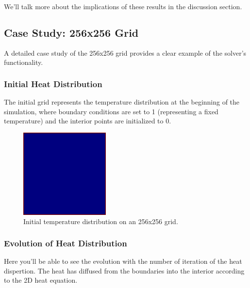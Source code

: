 \documentclass[11pt]{article}
\begin{document}
        We'll talk more about the implications of these results in the discussion section.

        \subsection{Case Study: 256x256 Grid}
        A detailed case study of the 256x256 grid provides a clear example of the solver's functionality.

        \subsubsection{Initial Heat Distribution}
    The initial grid represents the temperature distribution at the beginning of the simulation, where boundary conditions are set to 1 (representing a fixed temperature) and the interior points are initialized to 0.

    \begin{figure}[ht]
        \centering
        \includegraphics[width=0.4\textwidth]{img/initial_grid.png}
        \caption{Initial temperature distribution on an 256x256 grid.}
        \label{fig:initial_grid}
    \end{figure}

    \subsubsection{Evolution of Heat Distribution}
    Here you'll be able to see the evolution with the number of iteration of the heat dispertion. The heat has diffused from the boundaries into the interior according to the 2D heat equation.
\end{document}
